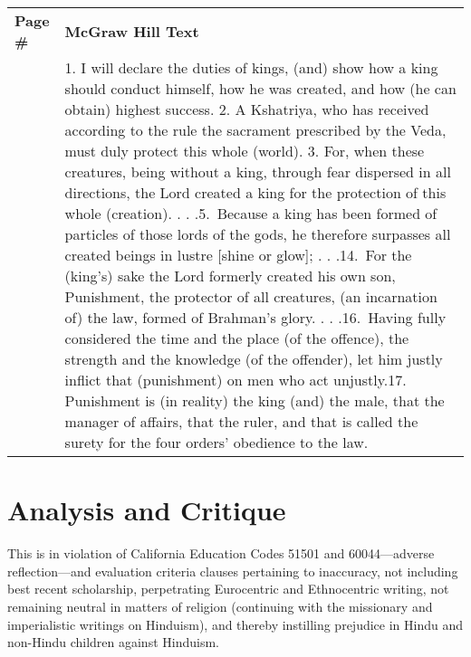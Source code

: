 \begin{longtable}{|>{\raggedleft}p{1.5cm}|p{8.5cm}|}
\multicolumn{2}{c}{\textbf{Table: 5}}\\ 
\hline
\textbf{Page \#} & \textbf{McGraw Hill Text} \tabularnewline
\hline 
281 & 1. I will declare the duties of kings, (and) show how a king should conduct himself, how he was created, and how (he can obtain) highest success. 2. A Kshatriya, who has received according to the rule the sacrament prescribed by the Veda, must duly protect this whole (world). 3. For, when these creatures, being without a king, through fear dispersed in all directions, the Lord created a king for the protection of this whole (creation). . . .5.\ Because a king has been formed of particles of those lords of the gods, he therefore surpasses all created beings in lustre [shine or glow]; . . .14.\ For the (king’s) sake the Lord formerly created his own son, Punishment, the protector of all creatures, (an incarnation of) the law, formed of Brahman’s glory. . . .16.\ Having fully considered the time and the place (of the offence), the strength and the knowledge (of the offender), let him justly inflict that (punishment) on men who act unjustly.17. Punishment is (in reality) the king (and) the male, that the manager of affairs, that the ruler, and that is called the surety for the four orders’ obedience to the law. \tabularnewline
\hline
\end{longtable}

\section*{Analysis and Critique} 

This is in violation of California Education Codes 51501 and 60044—adverse reflection—and evaluation criteria clauses pertaining to inaccuracy, not including best recent scholarship, perpetrating Eurocentric and Ethnocentric writing, not remaining neutral in matters of religion (continuing with the missionary and imperialistic writings on Hinduism), and thereby instilling prejudice in Hindu and non-Hindu children against Hinduism.
\newpage

